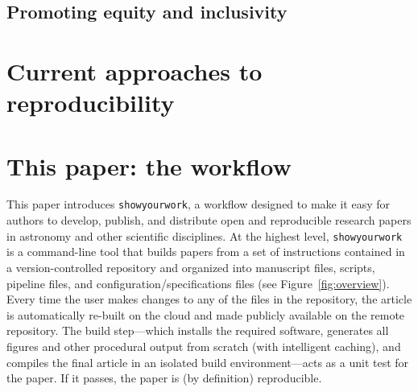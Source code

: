 \documentclass{aastex631}
\newcommand\syw{\texttt{showyourwork}\xspace}
\begin{document}
\subsection{Promoting equity and inclusivity}
\label{sec:args:dei}


\section{Current approaches to reproducibility}
\label{sec:intro:curr}
%
%

\section{This paper: the \showyourwork workflow}
\label{sec:intro:syw}
This paper introduces \syw, a workflow designed to make it easy for authors to develop, publish, and distribute open and reproducible research papers in astronomy and other scientific disciplines. 
At the highest level, \syw is a command-line tool that builds papers from a set of instructions contained in a version-controlled repository and organized into manuscript files, scripts, pipeline files, and configuration/specifications files (see Figure~\ref{fig:overview}).
Every time the user makes changes to any of the files in the repository, the article is automatically re-built on the cloud and made publicly available on the remote repository.
The build step---which installs the required software, generates all figures and other procedural output from scratch (with intelligent caching), and compiles the final article in an isolated build environment---acts as a unit test for the paper. 
If it passes, the paper is (by definition) reproducible.
\end{document}
